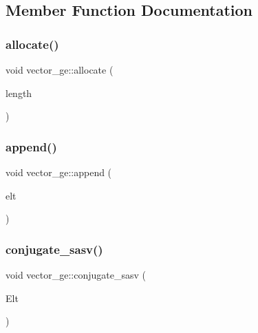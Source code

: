 \subsection{Member Function Documentation}
\mbox{\label{classvector__ge_a35b062a9201b30f0a87bf87702d243ae}} 
\subsubsection{\texorpdfstring{allocate()}{allocate()}}
{\footnotesize\ttfamily void vector\+\_\+ge\+::allocate (\begin{DoxyParamCaption}\item[{\mbox{\hyperlink{galois_8h_a09fddde158a3a20bd2dcadb609de11dc}{I\+NT}}}]{length }\end{DoxyParamCaption})}

\mbox{\label{classvector__ge_a6e24ff78ee23cd3e94b266038f059e83}} 
\subsubsection{\texorpdfstring{append()}{append()}}
{\footnotesize\ttfamily void vector\+\_\+ge\+::append (\begin{DoxyParamCaption}\item[{\mbox{\hyperlink{galois_8h_a09fddde158a3a20bd2dcadb609de11dc}{I\+NT}} $\ast$}]{elt }\end{DoxyParamCaption})}

\mbox{\label{classvector__ge_ab244736f9f689bd80c490563fa63ae5d}} 
\subsubsection{\texorpdfstring{conjugate\+\_\+sasv()}{conjugate\_sasv()}}
{\footnotesize\ttfamily void vector\+\_\+ge\+::conjugate\+\_\+sasv (\begin{DoxyParamCaption}\item[{\mbox{\hyperlink{galois_8h_a09fddde158a3a20bd2dcadb609de11dc}{I\+NT}} $\ast$}]{Elt }\end{DoxyParamCaption})}

